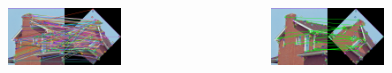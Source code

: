\documentclass[presentation,aspectratio=1610]{beamer}
\begin{document}
\begin{frame}
\begin{columns}
		
		\begin{figure}[htbp!]
			\centering
			\includegraphics[width=0.7\textwidth]{sift/match1.png}
		\end{figure}
		
		\begin{figure}[htbp!]
			\centering
			\includegraphics[width=0.7\textwidth]{sift/match2.png}
		\end{figure}
		
	\end{columns}

\end{frame}
\end{document}

